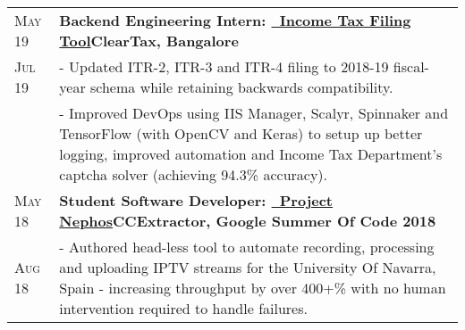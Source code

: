 \documentclass[a4paper,10pt]{extarticle} %
\begin{document}
\begin{tabularx}{\linewidth}{ l | X }
  \textsc{May 19}  & \textbf{Backend Engineering Intern: {\href{https://cleartax.in/income-tax-efiling}{\ Income Tax Filing Tool}}}\hfill\textbf{ClearTax, Bangalore}                                                                                                                                                                                             \\
  \textsc{Jul 19}  & {- Updated ITR-2, ITR-3 and ITR-4 filing to 2018-19 fiscal-year schema while retaining backwards compatibility.}                                                                                                                                                                                                                             \\
                   & {- Improved DevOps using IIS Manager, Scalyr, Spinnaker and TensorFlow (with OpenCV and Keras) to setup up better logging, improved automation and Income Tax Department's captcha solver (achieving 94.3\% accuracy).}                                                                                                                      \\[2mm]

  \textsc{May 18}  & \textbf{Student Software Developer: {\href{https://github.com/thealphadollar/Nephos}{\ Project Nephos}}}\hfill\textbf{CCExtractor, Google Summer Of Code 2018}                                                                                                                                                                               \\
  \textsc{Aug 18}  & {- Authored head-less tool to automate recording, processing and uploading IPTV streams for the University Of Navarra, Spain - increasing throughput by over 400+\% with no human intervention required to handle failures.}                                                                                                                 \\

\end{tabularx}

\end{document}
